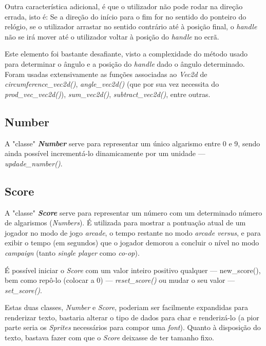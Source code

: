 \documentclass{report}
\begin{document}
Outra característica adicional, é que o utilizador não pode rodar na direção errada, isto é: Se a direção do início para o fim for no sentido do ponteiro do relógio, se o utilizador arrastar no sentido contrário até à posição final, o \textit{handle} não se irá mover até o utilizador voltar à posição do \textit{handle} no ecrã.

Este elemento foi bastante desafiante, visto a complexidade do método usado para determinar o ângulo e a posição do \textit{handle} dado o ângulo determinado. Foram usadas extensivamente as funções associadas ao \textit{Vec2d} de \textit{circumference\_vec2d()}, \textit{angle\_vec2d()} (que por sua vez necessita do \textit{prod\_vec\_vec2d()}), \textit{sum\_vec2d()}, \textit{subtract\_vec2d()}, entre outras.

\subsection{Number}

A "classe" \textbf{\textit{Number}} serve para representar um único algarismo entre 0 e 9, sendo ainda possível incrementá-lo dinamicamente por um unidade --- \textit{updade\_number()}.

\subsection{Score}

A "classe" \textbf{\textit{Score}} serve para representar um número com um determinado número de algarismos (\textit{Numbers}). É utilizada para mostrar a pontuação atual de um jogador no modo de jogo \textit{arcade}, o tempo restante no modo \textit{arcade versus}, e para exibir o tempo (em segundos) que o jogador demorou a concluir o nível no modo \textit{campaign} (tanto \textit{single player} como \textit{co-op}).

É possível iniciar o \textit{Score} com um valor inteiro positivo qualquer --- new\_score(), bem como repô-lo (colocar a 0) --- \textit{reset\_score()} ou mudar o seu valor --- \textit{set\_score()}. \newline

Estas duas classes, \textit{Number} e \textit{Score}, poderiam ser facilmente expandidas para renderizar texto, bastaria alterar o tipo de dados para char e renderizá-lo (a pior parte seria os \textit{Sprites} necessários para compor uma \textit{font}). Quanto à disposição do texto, bastava fazer com que o \textit{Score} deixasse de ter tamanho fixo.
\end{document}
